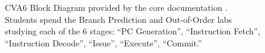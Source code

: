 
\begin{figure}[t]
    \centering
    \caption[
        CVA6 Block Diagram
    ]{
        CVA6 Block Diagram provided by the core documentation \cite{cva6}. Students spend the Branch Prediction and Out-of-Order labs studying each of the 6 stages: \enquote{PC Generation}, \enquote{Instruction Fetch}, \enquote{Instruction Decode}, \enquote{Issue}, \enquote{Execute}, \enquote{Commit.}
    }
    \label{fig:cva6_overview}
\end{figure}
